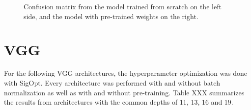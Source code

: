 \begin{figure}[h]
\centering
{}
\caption{Confusion matrix from the model trained from scratch on the left side, and the model with pre-trained weights on the right.}
\label{fig:alexnet-cm}
\end{figure}
















\section{VGG}

For the following VGG architectures, the hyperparameter optimization was done with SigOpt. Every architecture was performed with and without batch normalization as well as with and without pre-training. Table XXX summarizes the results from architectures with the common depths of 11, 13, 16 and 19.

